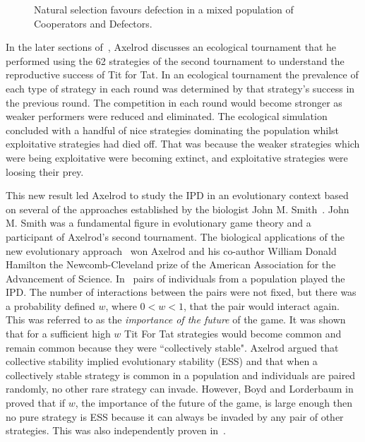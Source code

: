 \begin{figure}[!hbtp]
    \centering
    
    \caption{Natural selection favours defection in a mixed population of Cooperators
    and Defectors.}\label{fig:natural_selection_diagram}
\end{figure}

In the later sections of~\cite{Axelrod1980b}, Axelrod discusses an
ecological tournament that he performed using the 62 strategies of the second
tournament to understand the reproductive success of Tit for Tat. In an
ecological tournament the prevalence of each type of strategy in each round was
determined by that strategy's success in the previous round. The competition in
each round would become stronger as weaker performers were reduced and
eliminated. The ecological simulation concluded with a handful of nice
strategies dominating the population whilst exploitative strategies had died off.
That was because the weaker strategies which were being exploitative were becoming
extinct, and exploitative strategies were loosing their prey.

This new result led Axelrod to
study the IPD in an evolutionary context based on several of the approaches
established by the biologist John M. Smith~\cite{Smith1974,
Smith1979, Smith1973}. John M. Smith was a fundamental figure in evolutionary game theory and a
participant of Axelrod's second tournament. The biological applications of the
new evolutionary approach~\cite{Axelrod1981} won Axelrod and his co-author William
Donald Hamilton the
Newcomb-Cleveland prize of the American Association for the Advancement of
Science.
In~\cite{Axelrod1981} pairs of individuals from a
population played the IPD. The number of interactions between the pairs were
not fixed, but there was a probability defined \(w\), where \(0 < w < 1\), that the pair would interact again. This was referred to as the \textit{importance of the future}
of the game. It
was shown that for
a sufficient high \(w\) Tit For Tat strategies
would become common and remain common because they were ``collectively stable".
Axelrod argued that collective stability implied evolutionary stability (ESS)
and that when a collectively stable strategy is common in a population and
individuals are paired randomly, no other rare strategy can invade. However,
Boyd and Lorderbaum in~\cite{Boyd1987} proved that if \(w\), the importance of the
future of the game, is large enough then no pure strategy is ESS because it can
always be invaded by any pair of other strategies. This was also independently
proven in~\cite{Pudaite1987}.

